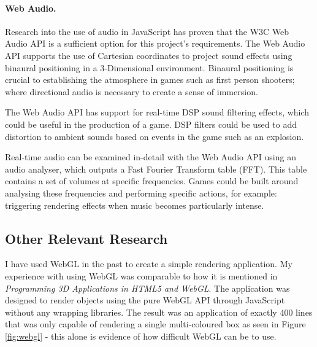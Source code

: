 \documentclass[a4paper, 12pt]{article}
\begin{document}
\paragraph{Web Audio.}
Research into the use of audio in JavaScript has proven that the W3C Web Audio API is a sufficient option for this project's requirements. The Web Audio API supports the use of Cartesian coordinates to project sound effects using binaural positioning in a 3-Dimensional environment.\cite{webaudio} Binaural positioning is crucial to establishing the atmosphere in games such as first person shooters; where directional audio is necessary to create a sense of immersion.

The Web Audio API has support for real-time DSP sound filtering effects, which could be useful in the production of a game. DSP filters could be used to add distortion to ambient sounds based on events in the game such as an explosion.

Real-time audio can be examined in-detail with the Web Audio API using an audio analyser, which outputs a Fast Fourier Transform table (FFT). This table contains a set of volumes at specific frequencies. Games could be built around analysing these frequencies and performing specific actions, for example: triggering rendering effects when music becomes particularly intense.

\subsection{Other Relevant Research}
I have used WebGL in the past to create a simple rendering application. My experience with using WebGL was comparable to how it is mentioned in \emph{Programming 3D Applications in HTML5 and WebGL}\cite{parisi2014programming}. The application was designed to render objects using the pure WebGL API through JavaScript without any wrapping libraries. The result was an application of exactly 400 lines that was only capable of rendering a single multi-coloured box as seen in Figure \ref{fig:webgl} - this alone is evidence of how difficult WebGL can be to use.
\end{document}

